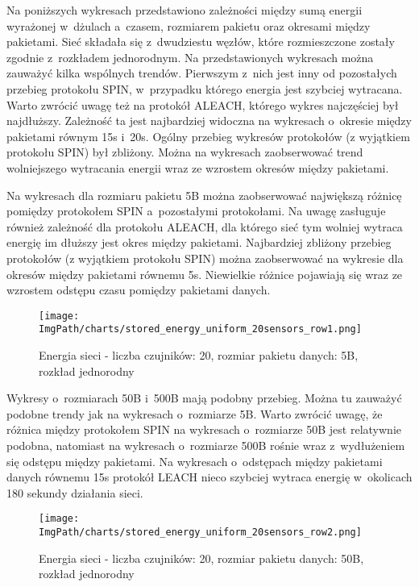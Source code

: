 Na poniższych wykresach przedstawiono zależności między sumą energii wyrażonej w~dżulach a~czasem, rozmiarem pakietu oraz okresami między pakietami. Sieć składała się z~dwudziestu węzłów, które rozmieszczone zostały zgodnie z~rozkładem jednorodnym.
Na przedstawionych wykresach można zauważyć kilka wspólnych trendów. Pierwszym z~nich jest inny od pozostałych przebieg protokołu SPIN, w~przypadku którego energia jest szybciej wytracana. Warto zwrócić uwagę też na protokół ALEACH, którego wykres najczęściej był najdłuższy. Zależność ta jest najbardziej widoczna na wykresach o~okresie między pakietami równym 15s i~20s. Ogólny przebieg wykresów protokołów (z wyjątkiem protokołu SPIN) był zbliżony. Można na wykresach zaobserwować trend wolniejszego wytracania energii wraz ze wzrostem okresów między pakietami.

Na wykresach dla rozmiaru pakietu 5B można zaobserwować największą różnicę pomiędzy protokołem SPIN a~pozostałymi protokołami. Na uwagę zasługuje również zależność dla protokołu ALEACH, dla którego sieć tym wolniej wytraca energię im dłuższy jest okres między pakietami. Najbardziej zbliżony przebieg protokołów (z wyjątkiem protokołu SPIN) można zaobserwować na wykresie dla okresów między pakietami równemu 5s. Niewielkie różnice pojawiają się wraz ze wzrostem odstępu czasu pomiędzy pakietami danych.

\begin{figure}[H]
	\begin{center}
		\texttt{[image: \\ImgPath/charts/stored\_energy\_uniform\_20sensors\_row1.png]}
	\end{center}
	\caption{Energia sieci - liczba czujników: 20, rozmiar pakietu danych: 5B, rozkład jednorodny}
\end{figure}
 
Wykresy o~rozmiarach 50B i~500B mają podobny przebieg. Można tu zauważyć podobne trendy jak na wykresach o~rozmiarze 5B. Warto zwrócić uwagę, że różnica między protokołem SPIN na wykresach o~rozmiarze 50B jest relatywnie podobna, natomiast na wykresach o~rozmiarze 500B rośnie wraz z~wydłużeniem się odstępu między pakietami. Na wykresach o~odstępach między pakietami danych równemu 15s protokół LEACH nieco szybciej wytraca energię w~okolicach 180 sekundy działania sieci.

\begin{figure}[H]
	\begin{center}
		\texttt{[image: \\ImgPath/charts/stored\_energy\_uniform\_20sensors\_row2.png]}
	\end{center}
	\caption{Energia sieci - liczba czujników: 20, rozmiar pakietu danych: 50B, rozkład jednorodny}
\end{figure}

